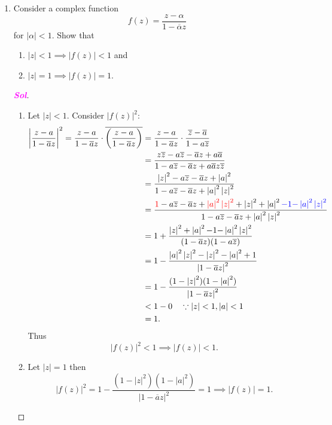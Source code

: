 \documentclass{article}
\theoremstyle{definition}
\newcommand{\of}[1]{\left( #1 \right)}
\newcommand{\abs}[1]{\left\lvert #1 \right\rvert}
\newcommand{\sol}{\textcolor{magenta}{\bf Sol}}
\newcommand{\conjugate}[1]{\overline{#1}}
\begin{document}
\begin{enumerate}
		\item Consider a complex function \[
		f\of{z}=\frac{z-\alpha}{1-\conjugate{\alpha}z}
		\] for $\abs{\alpha}<1$. Show that \begin{enumerate}
			\item $\abs{z}<1\implies\abs{f\of{z}}<1$ and
			\item $\abs{z}=1\implies\abs{f\of{z}}=1$.
		\end{enumerate}
		\begin{proof}[\sol]
			\begin{enumerate}
				\item Let $\abs{z}<1$. Consider $\abs{f\of{z}}^2$:
				\begin{align*}
				\left|\frac{z-a}{1-\conjugate{a}z}\right|^2=\frac{z-a}{1-\conjugate{a}z}\cdot\conjugate{\of{\frac{z-a}{1-\conjugate{a}z}}}&=\frac{z-a}{1-\conjugate{a}z}\cdot\frac{\conjugate{z}-\conjugate{a}}{1-a\conjugate{z}}\\
				&=\frac{z\conjugate{z}-a\conjugate{z}-\conjugate{a}z+a\conjugate{a}}{1-a\conjugate{z}-\conjugate{a}z+a\conjugate{a}z\conjugate{z}}\\
				&=\frac{\abs{z}^2-a\conjugate{z}-\conjugate{a}z+\abs{a}^2}{1-a\conjugate{z}-\conjugate{a}z+\abs{a}^2\abs{z}^2}\\
				&=\frac{\textcolor{red}{1}-a\conjugate{z}-\conjugate{a}z+\textcolor{red}{\abs{a}^2\abs{z}^2}+\abs{z}^2+\abs{a}^2\textcolor{blue}{-1}\textcolor{blue}{-\abs{a}^2\abs{z}^2}}{1-a\conjugate{z}-\conjugate{a}z+\abs{a}^2\abs{z}^2}\\
				&=1+\frac{\abs{z}^2+\abs{a}^2{-1}{-\abs{a}^2\abs{z}^2}}{(1-\conjugate{a}z)(1-a\conjugate{z})}\\
				&=1-\frac{{\abs{a}^2\abs{z}^2}-\abs{z}^2-\abs{a}^2+1}{\abs{1-\conjugate{a}z}^2}\\
				&=1-\frac{(1-\abs{z}^2)(1-\abs{a}^2)}{\abs{1-\conjugate{a}z}^2}\\
				&< 1-0\quad\because\abs{z}< 1, \abs{a}<1\\
				&=1.
				\end{align*} Thus \[
				\abs{f\of{z}}^2<1\implies\abs{f\of{z}}<1.
				\]
				
				\item Let $\abs{z}=1$ then \[
				\abs{f\of{z}}^2=1-\frac{(1-\abs{z}^2)(1-\abs{a}^2)}{\abs{1-\conjugate{a}z}^2}=1\implies\abs{f\of{z}}=1.
				\]
			\end{enumerate}
		\end{proof}
		

\end{enumerate}
\end{document}
